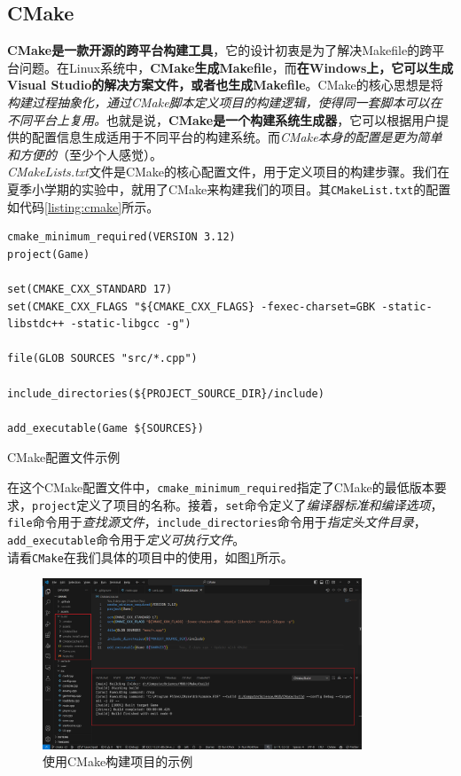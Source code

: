 \subsection{CMake}

\textbf{CMake是一款开源的跨平台构建工具}，它的设计初衷是为了解决Makefile的跨平台问题。在Linux系统中，\textbf{CMake生成Makefile}，而\textbf{在Windows上，它可以生成Visual Studio的解决方案文件，或者也生成Makefile}。CMake的核心思想是将\textit{构建过程抽象化，通过CMake脚本定义项目的构建逻辑，使得同一套脚本可以在不同平台上复用。}也就是说，\textbf{CMake是一个构建系统生成器}，它可以根据用户提供的配置信息生成适用于不同平台的构建系统。而\textit{CMake本身的配置是更为简单和方便的}（至少个人感觉）。\\

\textit{CMakeLists.txt}文件是CMake的核心配置文件，用于定义项目的构建步骤。我们在夏季小学期的实验中，就用了CMake来构建我们的项目。其\texttt{CMakeList.txt}的配置如代码\ref{listing:cmake}所示。

\begin{longlisting}
    \begin{verbatim}
cmake_minimum_required(VERSION 3.12)
project(Game)

set(CMAKE_CXX_STANDARD 17)
set(CMAKE_CXX_FLAGS "${CMAKE_CXX_FLAGS} -fexec-charset=GBK -static-libstdc++ -static-libgcc -g")

file(GLOB SOURCES "src/*.cpp")

include_directories(${PROJECT_SOURCE_DIR}/include)

add_executable(Game ${SOURCES})
    \end{verbatim}
    \caption{CMake配置文件示例}
    \label{listing:cmake}
\end{longlisting}

在这个CMake配置文件中，\texttt{cmake\_minimum\_required}指定了CMake的最低版本要求，\texttt{project}定义了项目的名称。接着，\texttt{set}命令定义了\textit{编译器标准和编译选项}，\texttt{file}命令用于\textit{查找源文件}，\texttt{include\_directories}命令用于\textit{指定头文件目录}，\texttt{add\_executable}命令用于\textit{定义可执行文件}。\\

请看\texttt{CMake}在我们具体的项目中的使用，如图\ref{fig:cmake}所示。

\begin{figure}[!htbp]
    \centering
    \includegraphics[width=0.85\textwidth]{Figures/cmake.png}
    \caption{使用CMake构建项目的示例}
    \label{fig:cmake}
\end{figure}

